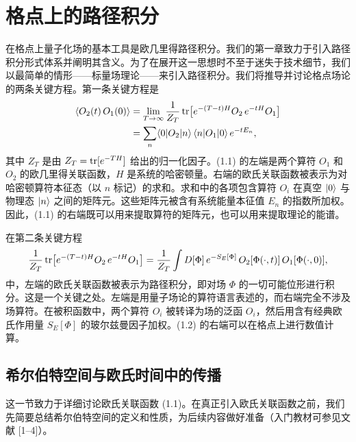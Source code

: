 
\chapter{格点上的路径积分}

在格点上量子化场的基本工具是欧几里得路径积分。我们的第一章致力于引入路径积分形式体系并阐明其含义。为了在展开这一思想时不至于迷失于技术细节，我们以最简单的情形——标量场理论——来引入路径积分。我们将推导并讨论格点场论的两条关键方程。第一条关键方程是
\begin{equation}
  \begin{split}
    \left\langle O_2(t)\,O_1(0) \right\rangle
    &= \lim_{T\to\infty}\frac{1}{Z_T}\operatorname{tr}\!\big[e^{-(T-t)H}O_2\,e^{-tH}O_1\big]\\
    &= \sum_n \langle0|O_2|n\rangle\,\langle n|O_1|0\rangle\,e^{-tE_n},
  \end{split}
\end{equation}
其中 $Z_T$ 是由 $Z_T = \operatorname{tr}[e^{-TH}]$ 给出的归一化因子。(1.1) 的左端是两个算符 $O_1$ 和 $O_2$ 的欧几里得关联函数，$H$ 是系统的哈密顿量。右端的欧氏关联函数被表示为对哈密顿算符本征态（以 $n$ 标记）的求和。求和中的各项包含算符 $O_i$ 在真空 $|0\rangle$ 与物理态 $|n\rangle$ 之间的矩阵元。这些矩阵元被含有系统能量本征值 $E_n$ 的指数所加权。因此，(1.1) 的右端既可以用来提取算符的矩阵元，也可以用来提取理论的能谱。

在第二条关键方程
\begin{equation}
  \frac{1}{Z_T}\operatorname{tr}\!\big[e^{-(T-t)H}O_2\,e^{-tH}O_1\big]
  = \frac{1}{Z_T}\int D[\Phi]\,e^{-S_E[\Phi]}\,O_2[\Phi(\cdot,t)]\,O_1[\Phi(\cdot,0)],
\end{equation}
中，左端的欧氏关联函数被表示为路径积分，即对场 $\Phi$ 的一切可能位形进行积分。这是一个关键之处。左端是用量子场论的算符语言表述的，而右端完全不涉及场算符。在被积函数中，两个算符 $O_i$ 被转译为场的泛函 $O_i$，然后用含有经典欧氏作用量 $S_E[\Phi]$ 的玻尔兹曼因子加权。(1.2) 的右端可以在格点上进行数值计算。

\section{希尔伯特空间与欧氏时间中的传播}

这一节致力于详细讨论欧氏关联函数 (1.1)。在真正引入欧氏关联函数之前，我们先简要总结希尔伯特空间的定义和性质，为后续内容做好准备（入门教材可参见文献 [1--4]）。

